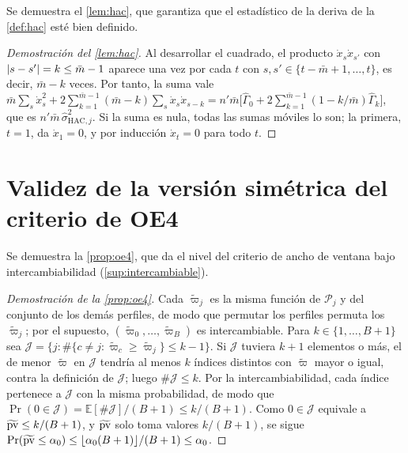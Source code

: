 Se demuestra el \cref{lem:hac}, que garantiza que el estadístico de la deriva de la
\cref{def:hac} esté bien definido.

\begin{proof}[Demostración del \cref{lem:hac}]
Al desarrollar el cuadrado, el producto $\dot x_s\dot x_{s'}$ con $\lvert s-s'\rvert=k\le\bar m-1$
aparece una vez por cada $t$ con $s,s'\in\{t-\bar m+1,\dots,t\}$, es decir, $\bar m-k$ veces. Por
tanto, la suma vale
$\bar m\sum_s\dot x_s^2+2\sum_{k=1}^{\bar m-1}(\bar m-k)\sum_s\dot x_s\dot x_{s-k}
=n'\bar m\bigl[\hat\Gamma_0+2\sum_{k=1}^{\bar m-1}(1-k/\bar m)\hat\Gamma_k\bigr]$, que es
$n'\bar m\,\hat\sigma^2_{\mathrm{HAC},j}$. Si la suma es nula, todas las sumas móviles lo son; la
primera, $t=1$, da $\dot x_1=0$, y por inducción $\dot x_t=0$ para todo $t$.
\end{proof}

\section{Validez de la versión simétrica del criterio de OE4}
\label{ap:dem-oe4}

Se demuestra la \cref{prop:oe4}, que da el nivel del criterio de ancho de ventana bajo
intercambiabilidad (\cref{sup:intercambiable}).

\begin{proof}[Demostración de la \cref{prop:oe4}]
Cada $\tilde\varpi_j$ es la misma función de $\mathcal{P}_j$ y del conjunto de los demás perfiles, de modo que permutar
los perfiles permuta los $\tilde\varpi_j$; por el supuesto, $(\tilde\varpi_0,\dots,\tilde\varpi_B)$ es intercambiable. Para
$k\in\{1,\dots,B+1\}$ sea $\mathcal{J}=\{j:\#\{c\ne j:\tilde\varpi_c\ge\tilde\varpi_j\}\le k-1\}$. Si $\mathcal{J}$ tuviera $k+1$ elementos
o más, el de menor $\tilde\varpi$ en $\mathcal{J}$ tendría al menos $k$ índices distintos con $\tilde\varpi$ mayor o igual, contra
la definición de $\mathcal{J}$; luego $\#\mathcal{J}\le k$. Por la intercambiabilidad, cada índice pertenece a $\mathcal{J}$ con
la misma probabilidad, de modo que $\Pr(0\in\mathcal{J})=\mathbb{E}[\#\mathcal{J}]/(B+1)\le k/(B+1)$. Como $0\in\mathcal{J}$
equivale a $\widetilde{\mathrm{pv}}\le k/(B+1)$, y $\widetilde{\mathrm{pv}}$ solo toma valores $k/(B+1)$, se sigue
$\Pr(\widetilde{\mathrm{pv}}\le\alpha_0)\le\lfloor\alpha_0(B+1)\rfloor/(B+1)\le\alpha_0$.
\end{proof}



